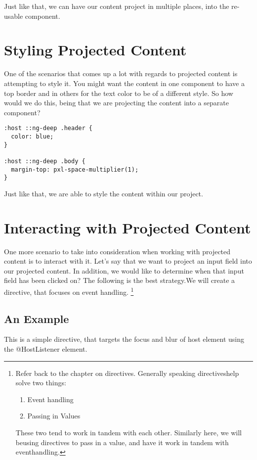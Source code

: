 Just like that, we can have our content project in multiple places, into the
re-usable component.

\section{Styling Projected Content}
One of the scenarios that comes up a lot with regards to projected content is attempting to style it. You might want the content in one component to have a top border and in others for the text color to be of a different style. So how would we do this, being that we are projecting the content into a separate component?
\begin{verbatim}
:host ::ng-deep .header {
  color: blue;
}

:host ::ng-deep .body {
  margin-top: pxl-space-multiplier(1);
}
\end{verbatim}

Just like that, we are able to style the content within our project.

\section{ Interacting with Projected Content }
One more scenario to take into consideration when working with projected content is to interact with it. Let's say that we want to project an input field into our projected content. In addition, we would like to determine when that input field has been clicked on? The following is the best strategy.We will create a directive, that focuses on event handling.
\footnote{Refer back to the chapter on directives. Generally speaking directiveshelp solve two things:
\begin{enumerate}
  \item Event handling
  \item Passing in Values
\end{enumerate}
These two tend to work in tandem with each other. Similarly here, we will beusing directives to pass in a value, and have it work in tandem with eventhandling.}

\subsection{ An Example }
This is a simple directive, that targets the focus and blur of host element using the @HostListener element.

